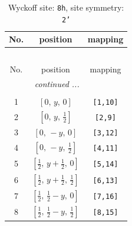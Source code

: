 \documentclass[fleqn,8pt]{jsarticle}
\begin{document}
\begin{longtable}{ccc}
\caption{Wyckoff site: {\tt 8h}, site symmetry: {\tt 2'}}
 \\
 \hline \hline
No. & position & mapping \\ \hline \endfirsthead

\multicolumn{2}{l}{\tablename\ \thetable{}} \\
 \hline \hline
No. & position & mapping \\ \hline \endhead

 \hline \hline
\multicolumn{2}{r}{\footnotesize\it continued ...} \\ \endfoot

 \hline \hline
\multicolumn{2}{r}{} \\ \endlastfoot

1 & $\left[ 0,\, y,\, 0 \right]$ & {\tt [1,10]} \\ \hline
2 & $\left[ 0,\, y,\, \frac{1}{2} \right]$ & {\tt [2,9]} \\ \hline
3 & $\left[ 0,\, - y,\, 0 \right]$ & {\tt [3,12]} \\ \hline
4 & $\left[ 0,\, - y,\, \frac{1}{2} \right]$ & {\tt [4,11]} \\ \hline
5 & $\left[ \frac{1}{2},\, y + \frac{1}{2},\, 0 \right]$ & {\tt [5,14]} \\ \hline
6 & $\left[ \frac{1}{2},\, y + \frac{1}{2},\, \frac{1}{2} \right]$ & {\tt [6,13]} \\ \hline
7 & $\left[ \frac{1}{2},\, \frac{1}{2} - y,\, 0 \right]$ & {\tt [7,16]} \\ \hline
8 & $\left[ \frac{1}{2},\, \frac{1}{2} - y,\, \frac{1}{2} \right]$ & {\tt [8,15]} \\
\end{longtable}
\renewcommand{\arraystretch}{1.2}
\end{document}
